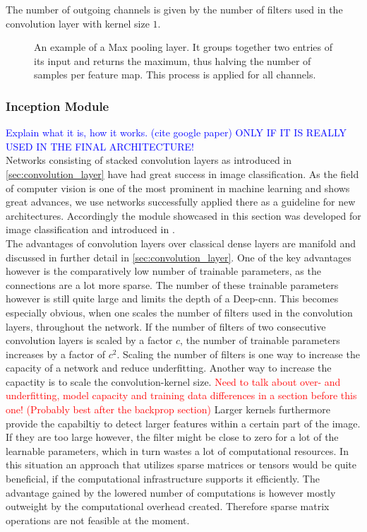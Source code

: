 The number of outgoing channels is given by the number of filters used in the convolution layer with kernel size $1$.
\begin{figure}
\centering

\caption[Max Pooling layer]{An example of a Max pooling layer. It groups together two entries of its input and returns the maximum, thus halving the number of samples per feature map. This process is applied for all channels.}\label{fig:max_pooling}
\end{figure}

\subsubsection{Inception Module}\label{sec:inception_module}
\textcolor{blue}{Explain what it is, how it works. (cite google paper) ONLY IF IT IS REALLY USED IN THE FINAL ARCHITECTURE!}\\
Networks consisting of stacked convolution layers as introduced in \autoref{sec:convolution_layer} have had great success in image classification. \cite{deep_learning_book, alex_net, ILSVRC15} As the field of computer vision is one of the most prominent in machine learning and shows great advances, we use networks successfully applied there as a guideline for new architectures. Accordingly the module showcased in this section was developed for image classification and introduced in \cite{inception_module}.\\
The advantages of convolution layers over classical dense layers are manifold and discussed in further detail in \autoref{sec:convolution_layer}. One of the key advantages however is the comparatively low number of trainable parameters, as the connections are a lot more sparse. The number of these trainable parameters however is still quite large and limits the depth of a Deep-\gls{cnn}. This becomes especially obvious, when one scales the number of filters used in the convolution layers, throughout the network. If the number of filters of two consecutive convolution layers is scaled by a factor $c$, the number of trainable parameters increases by a factor of $c^2$. Scaling the number of filters is one way to increase the capacity of a network and reduce underfitting. \cite{inception_module} Another way to increase the capactity is to scale the convolution-kernel size. \textcolor{red}{Need to talk about over- and underfitting, model capacity and training data differences in a section before this one! (Probably best after the backprop section)} Larger kernels furthermore provide the capabiltiy to detect larger features within a certain part of the image. If they are too large however, the filter might be close to zero for a lot of the learnable parameters, which in turn wastes a lot of computational resources. In this situation an approach that utilizes sparse matrices or tensors would be quite beneficial, if the computational infrastructure supports it efficiently. The advantage gained by the lowered number of computations is however mostly outweight by the computational overhead created. Therefore sparse matrix operations are not feasible at the moment. \cite{inception_module}\\
